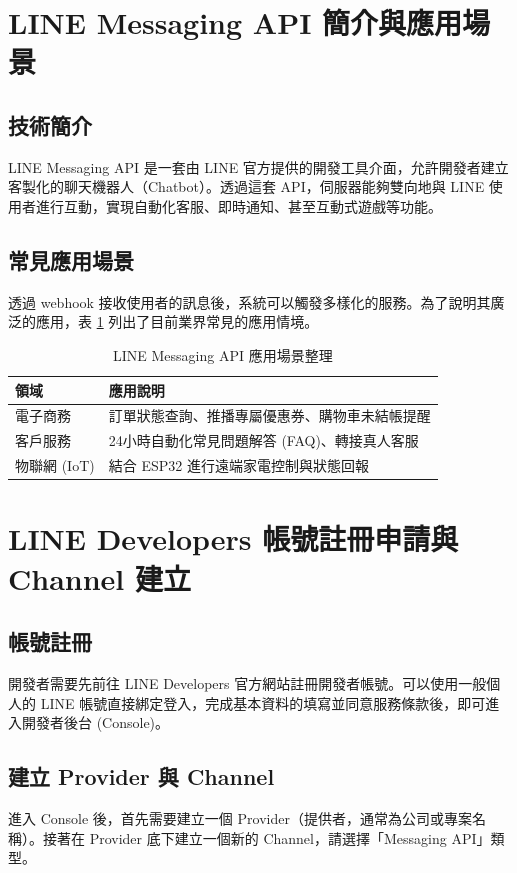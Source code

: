\documentclass[12pt, a4paper]{article} %
\begin{document}
\section{LINE Messaging API 簡介與應用場景}
\subsection{技術簡介}
LINE Messaging API 是一套由 LINE 官方提供的開發工具介面，允許開發者建立客製化的聊天機器人（Chatbot）。透過這套 API，伺服器能夠雙向地與 LINE 使用者進行互動，實現自動化客服、即時通知、甚至互動式遊戲等功能。

\subsection{常見應用場景}
透過 webhook 接收使用者的訊息後，系統可以觸發多樣化的服務。為了說明其廣泛的應用，表 \ref{tab:usecases} 列出了目前業界常見的應用情境。

\begin{table}[h]
\centering
\caption{LINE Messaging API 應用場景整理}
\label{tab:usecases}
\begin{tabular}{|l|l|}
\hline
\textbf{領域} & \textbf{應用說明} \\ \hline
電子商務 & 訂單狀態查詢、推播專屬優惠券、購物車未結帳提醒 \\ \hline
客戶服務 & 24小時自動化常見問題解答 (FAQ)、轉接真人客服 \\ \hline
物聯網 (IoT) & 結合 ESP32 進行遠端家電控制與狀態回報 \\ \hline
\end{tabular}
\end{table}

\newpage
\section{LINE Developers 帳號註冊申請與 Channel 建立}
\subsection{帳號註冊}
開發者需要先前往 LINE Developers 官方網站註冊開發者帳號。可以使用一般個人的 LINE 帳號直接綁定登入，完成基本資料的填寫並同意服務條款後，即可進入開發者後台 (Console)。

\subsection{建立 Provider 與 Channel}
進入 Console 後，首先需要建立一個 Provider（提供者，通常為公司或專案名稱）。接著在 Provider 底下建立一個新的 Channel，請選擇「Messaging API」類型。
\end{document}
